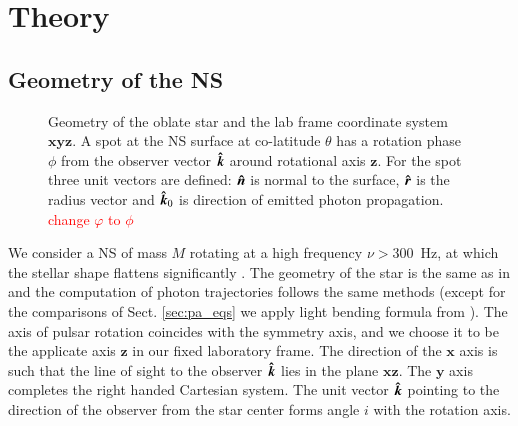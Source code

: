 \documentclass{aa}
\newcommand{\unit}[1]{\mbox{\boldmath $\hat{#1}$}}
\newcommand{\red}[1]{\textcolor{red}{#1}}
\begin{document}

\section{Theory}\label{sec:theory}
\subsection{Geometry of the NS}\label{sec:geometry}

\begin{figure}
\centering
\caption{Geometry of the oblate star and the lab frame coordinate system $\bm{xyz}$. A spot at the NS surface at co-latitude $\theta$ has a rotation phase  $\phi$ from the observer vector $\unit{k}$  around rotational axis  $\bm z$. For the spot three unit vectors are defined: $\unit{n}$ is normal to the surface, $\unit{r}$ is the radius vector and $\unit{k}_0$ is direction of emitted photon propagation.
\red{change $\varphi$ to $\phi$}
}
\label{fig:geometry}
\end{figure}



We consider a NS of mass $M$ rotating at a high frequency $\nu >300$~Hz, at which the stellar shape flattens significantly \citep{CMLC07,AGM14}. 
The geometry of the star is the same as in \citet{SNP18} and the computation of photon trajectories follows the same methods (except for the comparisons of Sect. \ref{sec:pa_eqs} we apply light bending formula from \citet{poutanen19}).
The axis of pulsar rotation coincides with the symmetry axis, and we choose it to be the applicate axis $\bm z$ in our fixed laboratory frame.  
The direction of the $\bm x$ axis is such that the line of sight to the  observer $\unit{k}$ lies in the plane $\bm{xz}$. 
The $\bm y$ axis completes the right handed Cartesian system.
The unit vector $\unit{k}$ pointing to the direction of the observer from the star center forms angle $i$ with the rotation axis. 
\end{document}
